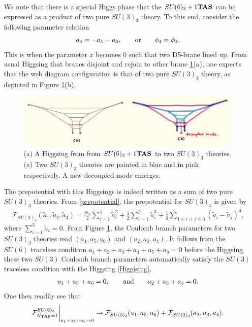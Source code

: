 \documentclass[11pt,a4paper]{article}
\begin{document}
We note that there is a special Higgs phase that the 
 $SU(6)_3+1{\bf TAS}$ can be expressed as a product of two pure $SU(3)_3$ theory. To this end, consider the following parameter relation
 \begin{align}
 	a_5= - a_1-a_6, \qquad {\rm or} \qquad \phi_4=\phi_1. \label{Higgising}
 \end{align}
 This is when the parameter $x$ becomes $0$ such that two D5-brane lined up. From usual Higgsing that branes disjoint and rejoin to other brane \ref{fig:SU6-Higgsing}(a), one expects that the web diagram configuration is that of two pure $SU(3)_3$ theory, as depicted in Figure \ref{fig:SU6-Higgsing}(b). 
\begin{figure}[t]
\centering
\includegraphics[width=12cm]{SU6-Higgsing.jpeg}
\caption{(a) A Higgsing from from $SU(6)_3+1{\bf TAS}$ to two $SU(3)_3$ theories. (a) Two $SU(3)_3$ theories are painted in blue and in pink respectively. A new decoupled mode emerges.}
\label{fig:SU6-Higgsing}
\end{figure}
The prepotential with this Higgsings is indeed written as a sum of two pure $SU(3)_3$ theories.
From \ref{prepotential}, the prepotential for $SU(3)_3$ is given by
\begin{align}
\mathcal{F}_{SU(3)_{3}} (\tilde a_1,\tilde a_2,\tilde a_3)= \frac{m_0}{2}\sum_{i=1}^3\tilde a_i^2 + \frac{1}{2}\sum_{i=1}^3 \tilde a_i^3 +\frac{1}{6}\sum_{1 \leq i < j \leq 3}(\tilde a_i - \tilde a_j)^3 , 
\end{align}
where $\sum_{i=1}^3 \tilde a_i=0$. From Figure \ref{fig:SU6-Higgsing}, the Coulomb branch parameters for two $SU(3)_3$ theories read $(a_1, a_5, a_6)$ and $(a_2, a_3, a_4)$. It follows from the $SU(6)$ traceless condition $a_1+a_2+a_3+a_4+a_5+a_6=0$ before the Higgsing, these two $SU(3)$ Coulomb branch parameters automatically satisfy the $SU(3)$ traceless condition with the Higgsing \eqref{Higgising}, 
\begin{align}
	a_1+a_5+a_6=0, \qquad {\rm and} \qquad a_2+a_3+a_4=0.
\end{align}
One then readily see that 
\begin{align}
\mathcal{F}^{SU(6)_{3}}_{N_{{\bf TAS}}=1}{}\bigg|_{a_1+a_5+a_6\to0}	\rightarrow \mathcal{F}_{SU(3)_{3}} (a_1, a_5,a_6) + \mathcal{F}_{SU(3)_{3}} (a_2, a_3,a_4).
\end{align}
\end{document}
